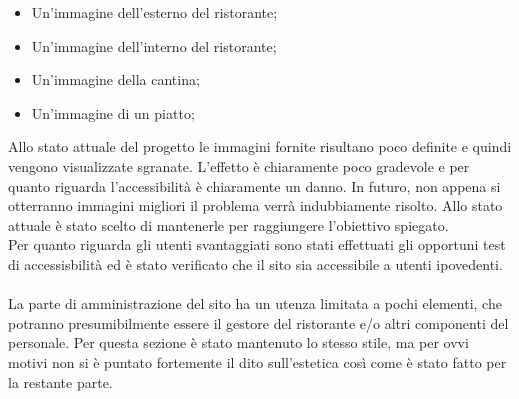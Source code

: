 \begin{itemize}

	\item Un'immagine dell'esterno del ristorante;
	\item Un'immagine dell'interno del ristorante;
	\item Un'immagine della cantina;
	\item Un'immagine di un piatto;

\end{itemize}
Allo stato attuale del progetto le immagini fornite risultano poco definite e quindi vengono visualizzate sgranate. L'effetto è chiaramente poco gradevole e per quanto riguarda l'accessibilità è chiaramente un danno. In futuro, non appena si otterranno immagini migliori il problema verrà indubbiamente risolto. Allo stato attuale è stato scelto di mantenerle per raggiungere l'obiettivo spiegato.\\
Per quanto riguarda gli utenti svantaggiati sono stati effettuati gli opportuni test di accessisbilità ed è stato verificato che il sito sia accessibile a utenti ipovedenti.\\ \\
La parte di amministrazione del sito ha un utenza limitata a pochi elementi, che potranno presumibilmente essere il gestore del ristorante e/o altri componenti del personale. Per questa sezione è stato mantenuto lo stesso stile, ma per ovvi motivi non si è puntato fortemente il dito sull'estetica così come è stato fatto per la restante parte.
